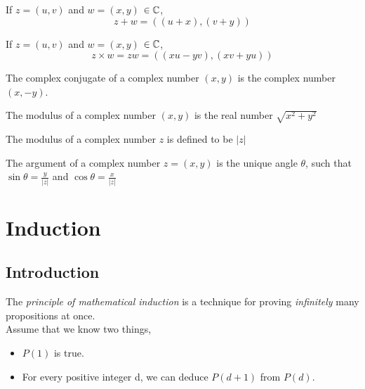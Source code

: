 \documentclass[a4paper]{article}
\begin{document}
\begin{ndefi}[Addition of $\C$]
If $z = (u, v )$ and $w = (x, y)$ $\in \mathbb{C}$,
$$z + w = ((u+x),(v+y))$$
\end{ndefi}

\begin{ndefi}[Multiplication of $\C$]
If $z = (u, v )$ and $w = (x, y)$ $\in \mathbb{C}$,
$$z \times w = zw = ((xu - yv), (xv + yu))$$
\end{ndefi}

\begin{ndefi}[Conjugate]
The complex conjugate of a complex number $(x,y)$ is the complex number $(x,−y)$.
\end{ndefi}

\begin{ndefi}[Modulus]
The modulus of a complex number $(x, y)$ is the real number $\sqrt{x^2 + y^2}$
\end{ndefi}
\begin{notation}
The modulus of a complex number $z$ is defined to be $|z|$
\end{notation}

\begin{ndefi}[Argument]
The argument of a complex number $z = (x, y)$ is the unique angle $\theta$, such that $\sin \theta = \frac{y}{|z|}$ and $\cos \theta = \frac{x}{|z|}$
\end{ndefi}

\section{Induction}
\subsection{Introduction}
The \emph{principle of mathematical induction} is a technique for proving \emph{infinitely} many propositions at once.
\vspace{0.5cm}\\
Assume that we know two things,
\begin{itemize}
	\item $P(1)$ is true.
	\item For every positive integer d, we can deduce $P(d + 1)$ from $P(d)$.
\end{itemize}
\end{document}
